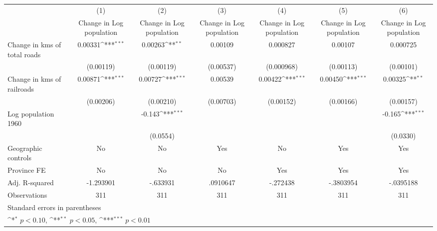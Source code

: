 {
\def\sym#1{\ifmmode^{#1}\else\(^{#1}\)\fi}
\begin{tabular}{l*{6}{c}}
\hline\hline
                    &\multicolumn{1}{c}{(1)}&\multicolumn{1}{c}{(2)}&\multicolumn{1}{c}{(3)}&\multicolumn{1}{c}{(4)}&\multicolumn{1}{c}{(5)}&\multicolumn{1}{c}{(6)}\\
                    &\multicolumn{1}{c}{Change in Log population}&\multicolumn{1}{c}{Change in Log population}&\multicolumn{1}{c}{Change in Log population}&\multicolumn{1}{c}{Change in Log population}&\multicolumn{1}{c}{Change in Log population}&\multicolumn{1}{c}{Change in Log population}\\
\hline
Change in kms of total roads&     0.00331\sym{***}&     0.00263\sym{**} &     0.00109         &    0.000827         &     0.00107         &    0.000725         \\
                    &   (0.00119)         &   (0.00119)         &   (0.00537)         &  (0.000968)         &   (0.00113)         &   (0.00101)         \\
[1em]
Change in kms of railroads&     0.00871\sym{***}&     0.00727\sym{***}&     0.00539         &     0.00422\sym{***}&     0.00450\sym{***}&     0.00325\sym{**} \\
                    &   (0.00206)         &   (0.00210)         &   (0.00703)         &   (0.00152)         &   (0.00166)         &   (0.00157)         \\
[1em]
Log population 1960 &                     &      -0.143\sym{***}&                     &                     &                     &      -0.165\sym{***}\\
                    &                     &    (0.0554)         &                     &                     &                     &    (0.0330)         \\
\hline
Geographic controls &          No         &          No         &         Yes         &          No         &         Yes         &         Yes         \\
Province FE         &          No         &          No         &          No         &         Yes         &         Yes         &         Yes         \\
Adj. R-squared      &   -1.293901         &    -.633931         &    .0910647         &    -.272438         &   -.3803954         &   -.0395188         \\
Observations        &         311         &         311         &         311         &         311         &         311         &         311         \\
\hline\hline
\multicolumn{7}{l}{\footnotesize Standard errors in parentheses}\\
\multicolumn{7}{l}{\footnotesize \sym{*} \(p<0.10\), \sym{**} \(p<0.05\), \sym{***} \(p<0.01\)}\\
\end{tabular}
}
